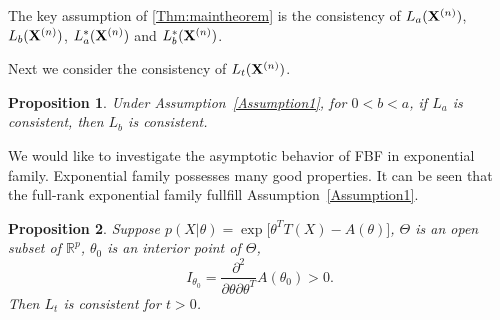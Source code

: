 \documentclass[3p]{elsarticle}
\theoremstyle{plain}
\newtheorem{proposition}{\quad\quad Proposition}
\theoremstyle{definition}
\theoremstyle{remark}
\begin{document}
The key assumption of \ref{Thm:maintheorem} is the consistency of $L_a(\mathbf{X}^{(n)})$, $L_b(\mathbf{X}^{(n)})$, $L_a^*(\mathbf{X}^{(n)})$ and $L_{b}^*(\mathbf{X}^{(n)})$.

Next we consider the consistency of $L_t(\mathbf{X}^{(n)})$.

\begin{proposition}
    Under Assumption~\ref{Assumption1}, for $0<b<a$, if $L_a$ is consistent, then $L_{b}$ is consistent.
\end{proposition}



We would like to investigate the asymptotic behavior of FBF in exponential family.
Exponential family possesses many good properties.
It can be seen that the full-rank exponential family fullfill Assumption~\ref{Assumption1}.
\begin{proposition}
    Suppose $p(X|\theta)=\exp\big[\theta^T T(X)-A(\theta)\big]$, $\Theta$ is an open subset of $\mathbb{R}^p$, $\theta_0$ is an interior point of $\Theta$, 
    $$I_{\theta_0}=\frac{\partial^2}{\partial \theta \partial \theta^T} A(\theta_0)>0.$$
    Then $L_{t}$ is consistent for $t>0$.
\end{proposition}
\end{document}
